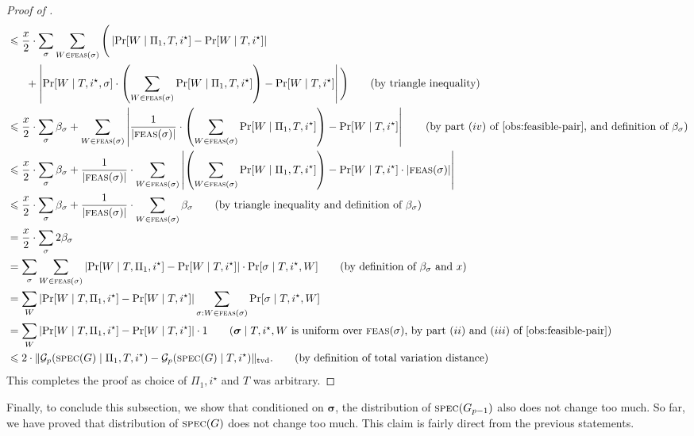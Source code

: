 \documentclass[11pt]{article}
\theoremstyle{definition}
\renewcommand{\leq}{\leqslant}
\newcommand{\tvd}[2]{\ensuremath{\norm{#1 - #2}_{\mathrm{tvd}}}}
\newcommand{\paren}[1]{\ensuremath{\left(#1\right)}\xspace}
\newcommand{\card}[1]{\left\vert{#1}\right\vert}
\newcommand{\norm}[1]{\ensuremath{\|#1\|}}
\DeclareMathOperator*{\Prob}{\ensuremath{\textnormal{Pr}}}
\renewcommand{\Pr}{\Prob}
\newcommand{\cG}{\ensuremath{\mathcal{G}}}
\newcommand{\spec}{\ensuremath{\textnormal{\textsc{spec}}}}
\newcommand{\istar}{\ensuremath{i^{\star}}}
\newcommand{\Prot}{\ensuremath{\Pi}}
\newcommand{\rsigma}{\ensuremath{\bm{\sigma}}}
\begin{document}
\begin{proof}[Proof of ]
\begin{align*}
			&\leq  \frac{x}2 \cdot  \sum_{\sigma} \sum_{W \in \feas(\sigma)} \Bigg(\card{\Pr[W \mid \Prot_1, T, \istar]- \Pr[W \mid T, \istar]}\\
			&\hspace{6mm} + \card{\Pr[W \mid T, \istar, \sigma ] \cdot \paren{ \sum_{W \in \feas(\sigma)} \Pr[W \mid \Prot_1, T, \istar]} - \Pr[W \mid T, \istar]}\Bigg) \tag{by triangle inequality}\\
			&\leq \frac{x}2 \cdot \sum_{\sigma} \beta_{\sigma} +  \sum_{W \in \feas(\sigma)}\card{\frac1{\card{\feas(\sigma)}} \cdot \paren{ \sum_{W \in \feas(\sigma)} \Pr[W \mid \Prot_1, T, \istar]} - \Pr[W \mid T, \istar]} \tag{by part $(iv)$ of \Cref{obs:feasible-pair}, and definition of $\beta_\sigma$} \\
			&\leq \frac{x}2 \cdot \sum_{\sigma} \beta_{\sigma}	+ \frac1{\card{\feas(\sigma)}} \cdot\sum_{W \in \feas(\sigma)}\card{ \paren{ \sum_{W \in \feas(\sigma)} \Pr[W \mid \Prot_1, T, \istar]} - \Pr[W \mid T, \istar] \cdot \card{\feas(\sigma)}}\\
			&\leq \frac{x}2 \cdot \sum_{\sigma} \beta_{\sigma} + \frac1{\card{\feas(\sigma)}} \cdot\sum_{W \in \feas(\sigma)} \beta_{\sigma} \tag{by triangle inequality and definition of $\beta_{\sigma}$} \\
			&= \frac{x}2 \cdot \sum_{\sigma} 2 \beta_{\sigma} \\
			&=   \sum_{\sigma} \sum_{W \in \feas(\sigma)} \card{\Pr[W \mid T, \Prot_1, \istar] - \Pr[W \mid T, \istar]} \cdot \Pr[\sigma \mid T, \istar, W] \tag{by definition of $\beta_{\sigma}$ and $x$} \\
			&= \sum_{W} \card{\Pr[W \mid T, \Prot_1, \istar] - \Pr[W \mid T, \istar]} \sum_{\sigma: W \in \feas(\sigma)}  \Pr[\sigma \mid T, \istar, W] \\
			&=  \sum_{W} \card{\Pr[W \mid T, \Prot_1, \istar] - \Pr[W \mid T, \istar]} \cdot 1 \tag{$\rsigma \mid T, \istar, W$ is uniform over $\feas(\sigma)$, by part $(ii)$ and $(iii)$ of \Cref{obs:feasible-pair}} \\
			&\leq	2 \cdot \tvd{\cG_p(\spec(G) \mid \Prot_1, T, \istar)}{\cG_p(\spec(G) \mid T, \istar)}. \tag{by definition of total variation distance}
		\end{align*}
		This completes the proof as choice of $\Prot_1, \istar$ and $T$ was arbitrary. 
	\end{proof}
	
	Finally, to conclude this subsection, we show that conditioned on $\rsigma$, the distribution of $\spec(G_{p-1})$ also does not change too much. So far, we have proved that distribution of $\spec(G)$ does not change too much. This claim is fairly direct from the previous statements.
	
\end{document}
